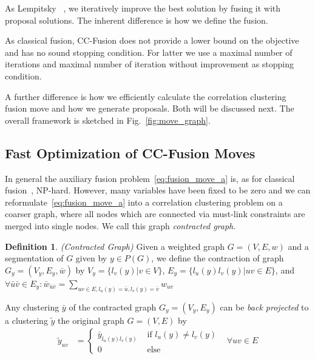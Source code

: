\documentclass[10pt,twocolumn,letterpaper]{article}
\theoremstyle{definition}
\newtheorem{definition}{Definition}
\begin{document}
As Lempitsky \etal~\cite{Lempitsky-2010}, 
we iteratively improve the best solution by
fusing it with proposal solutions.
The inherent difference is how we define the fusion.

As classical fusion, CC-Fusion does not provide a lower bound on the objective and 
has no sound stopping condition.
For latter we use a maximal number of iterations and maximal number of iteration without improvement as stopping condition.

A further difference is how we efficiently calculate the correlation clustering fusion move and how we generate proposals.
Both will be discussed next. The overall framework is sketched in Fig.~\ref{fig:move_graph}.




%
%
%

%


\subsection{Fast Optimization of CC-Fusion Moves} \label{sec:fast_optimization}
In general the auxiliary fusion problem~\ref{eq:fusion_move_a} is, as for classical fusion~\cite{Lempitsky-2010}, NP-hard.
However, many variables have been fixed to be zero and we can reformulate~\ref{eq:fusion_move_a}
into a correlation clustering problem on a coarser graph, where all nodes which are connected
via must-link constraints are merged into single nodes. We call this graph \emph{contracted graph}.
%
\begin{definition}\emph{(Contracted Graph)}
Given a weighted graph $G=(V,E,w)$ and a segmentation of $G$ given by $y\in P(G)$,
we define the contraction of graph $G_y=(V_y,E_y, \bar{w})$
by $V_y=\{l_v(y)|v\in V\}$, $E_y=\{l_u(y)l_v(y)|uv\in E\}$, and 
$\forall \bar{u}\bar{v}\in E_y: \bar{w}_{\bar{u}\bar{v}}=\sum_{uv\in E, l_u(y)=\bar{u},l_v(y)=\bar{v}}w_{uv}$ 
\end{definition}
%
Any clustering $\bar{y}$ of the contracted graph $G_y=(V_y,E_y)$ can be \emph{back projected} to a clustering $\tilde{y}$ the original graph $G=(V,E)$ by
%
\begin{align}
\tilde{y}_{uv}&=\left\{ 
\begin{array}{ll}
\bar{y}_{l_u(y)l_v(y)}& \textrm{ if }l_u(y) \neq l_v(y)\\
0                & \textrm{ else}
\end{array}
\right.& \forall uv \in E
\end{align}
\end{document}
